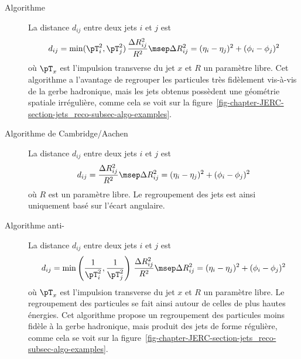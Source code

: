 \begin{description}
\item[Algorithme \kT] La distance $d_{ij}$ entre deux jets $i$ et $j$ est
\begin{equation}
d_{ij} = \min({\pT}_i^2, {\pT}_j^2) \, \frac{\Delta R_{ij}^2}{R^2}
\msep
\Delta R_{ij}^2 = (\eta_i-\eta_j)^2 + (\phi_i-\phi_j)^2
\end{equation}
où ${\pT}_x$ est l'impulsion transverse du jet $x$ et $R$ un paramètre libre.
Cet algorithme a l'avantage de regrouper les particules très fidèlement vis-à-vis de la gerbe hadronique, mais les jets obtenus possèdent une géométrie spatiale irrégulière, comme cela se voit sur la figure~\ref{fig-chapter-JERC-section-jets_reco-subsec-algo-examples}.
\item[Algorithme de Cambridge/Aachen] La distance $d_{ij}$ entre deux jets $i$ et $j$ est
\begin{equation}
d_{ij} = \frac{\Delta R_{ij}^2}{R^2}
\msep
\Delta R_{ij}^2 = (\eta_i-\eta_j)^2 + (\phi_i-\phi_j)^2
\end{equation}
où $R$ est un paramètre libre. Le regroupement des jets est ainsi uniquement basé sur l'écart angulaire.
\item[Algorithme anti-\kT~\cite{Cacciari_antikT}] La distance $d_{ij}$ entre deux jets $i$ et $j$ est
\begin{equation}
d_{ij} = \min\left(\frac{1}{{\pT}_i^2}, \frac{1}{{\pT}_j^2}\right) \, \frac{\Delta R_{ij}^2}{R^2}
\msep
\Delta R_{ij}^2 = (\eta_i-\eta_j)^2 + (\phi_i-\phi_j)^2
\end{equation}
où ${\pT}_x$ est l'impulsion transverse du jet $x$ et $R$ un paramètre libre.
Le regroupement des particules se fait ainsi autour de celles de plus hautes énergies.
Cet algorithme propose un regroupement des particules moins fidèle à la gerbe hadronique, mais produit des jets de forme régulière, comme cela se voit sur la figure~\ref{fig-chapter-JERC-section-jets_reco-subsec-algo-examples}.
\end{description}
